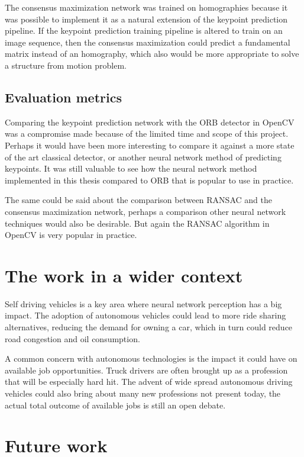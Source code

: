 The consensus maximization network was trained on homographies because it was possible to implement it as a natural extension of the keypoint prediction pipeline. If the keypoint prediction training pipeline is altered to train on an image sequence, then the consensus maximization could predict a fundamental matrix instead of an homography, which also would be more appropriate to solve a structure from motion problem.

\subsection{Evaluation metrics}

Comparing the keypoint prediction network with the ORB detector in OpenCV was a compromise made because of the limited time and scope of this project. Perhaps it would have been more interesting to compare it against a more state of the art classical detector, or another neural network method of predicting keypoints. It was still valuable to see how the neural network method implemented in this thesis compared to ORB that is popular to use in practice.

The same could be said about the comparison between RANSAC and the consensus maximization network, perhaps a comparison other neural network techniques would also be desirable. But again the RANSAC algorithm in OpenCV is very popular in practice.

\section{The work in a wider context}

Self driving vehicles is a key area where neural network perception has a big impact. The adoption of autonomous vehicles could lead to more ride sharing alternatives, reducing the demand for owning a car, which in turn could reduce road congestion and oil consumption. \cite{transportation}

A common concern with autonomous technologies is the impact it could have on available job opportunities. Truck drivers are often brought up as a profession that will be especially hard hit. The advent of wide spread autonomous driving vehicles could also bring about many new professions not present today, the actual total outcome of available jobs is still an open debate.\cite{sociology}

\section{Future work}

